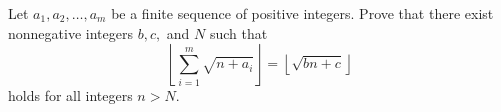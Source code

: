 Let $a_1,a_2,\dots,a_m$ be a finite sequence of positive integers. Prove that there exist nonnegative integers $b,c,$ and $N$ such that $$\left\lfloor \sum_{i=1}^m \sqrt{n+a_i} \right\rfloor =\left\lfloor \sqrt{bn+c} \right\rfloor$$holds for all integers $n>N.$

